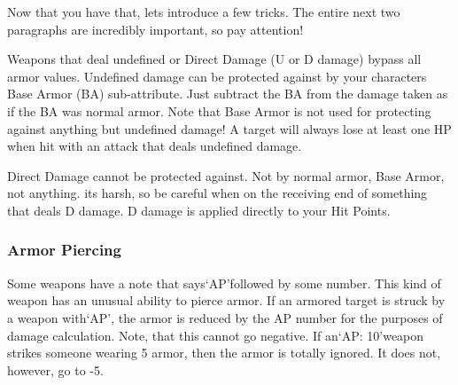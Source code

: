 \documentclass[twoside]{book}
\begin{document}
  
  

  

  
    {  
    Now that you have that, lets introduce a few tricks. The entire next two paragraphs are incredibly important, so pay attention!
    }
  
    {  
    Weapons that deal undefined or Direct Damage (U or D damage) bypass all armor values. Undefined damage can be protected against by your characters Base Armor (BA) sub-attribute. Just subtract the BA from the damage taken as if the BA was normal armor. Note that Base Armor is not used for protecting against anything but undefined damage! A target will always lose at least one HP when hit with an attack that deals undefined damage.
    }
  
    {  
    Direct Damage cannot be protected against. Not by normal armor, Base Armor, not anything. its harsh, so be careful when on the receiving end of something that deals D damage. D damage is applied directly to your Hit Points.
    }
  
    

\subsubsection{Armor Piercing}
    
    {  
    Some weapons have a note that says`AP'followed by some number. This kind of weapon has an unusual ability to pierce armor. If an armored target is struck by a weapon with`AP', the armor is reduced by the AP number for the purposes of damage calculation. Note, that this cannot go negative. If an`AP: 10'weapon strikes someone wearing 5 armor, then the armor is totally ignored. It does not, however, go to -5.
    }
  
\end{document}
